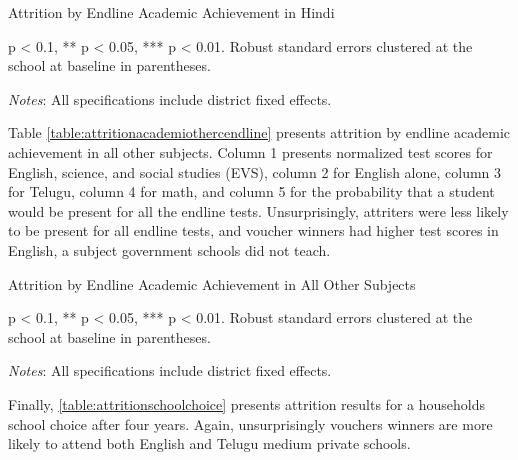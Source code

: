 \documentclass[hidelinks, 12pt, titlepage]{article}
\begin{document}
			\begin{table}[htb]
				\begin{threeparttable}
					\centering
					\caption{Attrition by Endline Academic Achievement in Hindi\label{table:attritionacademihindicendline}}
					
					\begin{tablenotes}
						\item * p < 0.1, ** p < 0.05, *** p < 0.01. Robust standard errors clustered at the school at baseline in parentheses.
						\item \emph{Notes}: All specifications include district fixed effects.
					\end{tablenotes}
				\end{threeparttable}
			\end{table}

			Table \ref{table:attritionacademiothercendline} presents attrition by endline academic achievement in all other subjects.  Column 1 presents normalized test scores for English, science, and social studies (EVS), column 2 for English alone, column 3 for Telugu, column 4 for math, and column 5 for the probability that a student would be present for all the endline tests.  Unsurprisingly, attriters were less likely to be present for all endline tests, and voucher winners had higher test scores in English, a subject government schools did not teach.

			\begin{table}[htb]
				\begin{threeparttable}
					\centering
					\caption{Attrition by Endline Academic Achievement in All Other Subjects\label{table:attritionacademiothercendline}}
					
					\begin{tablenotes}
						\item * p < 0.1, ** p < 0.05, *** p < 0.01. Robust standard errors clustered at the school at baseline in parentheses.
						\item \emph{Notes}: All specifications include district fixed effects.
					\end{tablenotes}
				\end{threeparttable}
			\end{table}

			Finally, \ref{table:attritionschoolchoice} presents attrition results for a households school choice after four years.  Again, unsurprisingly vouchers winners are more likely to attend both English and Telugu medium private schools.
\end{document}
